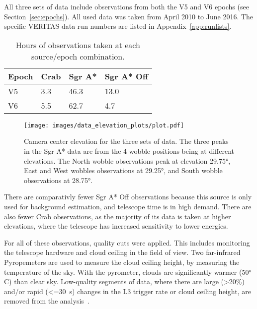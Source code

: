   All three sets of data include observations from both the V5 and V6 epochs (see Section~\ref{sec:epochs}).
  All used data was taken from April 2010 to June 2016.
  The specific VERITAS data run numbers are listed in Appendix~\ref{app:runlists}.

  \begin{table}[]
    \centering
    \caption{Hours of observations taken at each source/epoch combination.}
    \label{tab:observation_times}
    \begin{tabular}{|l|l|l|l|}
      \hline
      \textbf{Epoch} & \textbf{Crab} & \textbf{Sgr A*} & \textbf{Sgr A* Off} \\ \hline
      V5             & 3.3           & 46.3            & 13.0                \\ \hline
      V6             & 5.5           & 62.7            & 4.7                 \\ \hline
    \end{tabular}
  \end{table}


  \begin{figure}[ht]
    \centering
    \texttt{[image: images/data\_elevation\_plots/plot.pdf]}
    \caption[VERITAS Data Elevation Exposure]{
      Camera center elevation for the three sets of data.
      The three peaks in the Sgr A* data are from the 4 wobble positions being at different elevations.
      The North wobble observations peak at elevation \nicetilde\ang{29.75}, East and West wobbles observations at \nicetilde\ang{29.25}, and South wobble observations at \nicetilde\ang{28.75}.
    }
    \label{fig:datapointingelevations}
  \end{figure}

  There are comparativly fewer Sgr A* Off observations because this source is only used for background estimation, and telescope time is in high demand.
  There are also fewer Crab observations, as the majority of its data is taken at higher elevations, where the telescope has increased sensitivity to lower energies.
  
  For all of these observations, quality cuts were applied.
  This includes monitoring the telescope hardware and cloud ceiling in the field of view.
  Two far-infrared Pyropemeters are used to measure the cloud ceiling height, by measuring the temperature of the sky.
  With the pyrometer, clouds are significantly warmer (\nicetilde\ang{50} C) than clear sky.
  Low-quality segments of data, where there are large (>20\%) and/or rapid (<=\SI{30}{s}) changes in the L3 trigger rate or cloud ceiling height, are removed from the analysis~\cite{bird_weather}.

